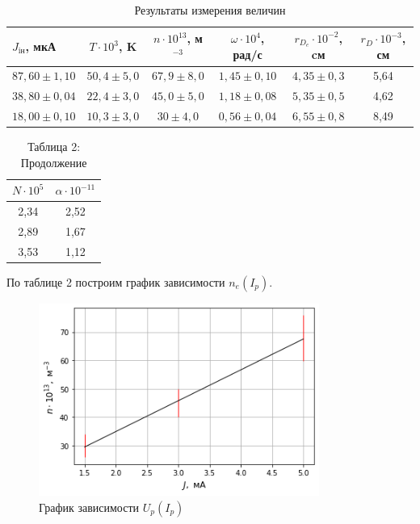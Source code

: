 \documentclass[a4paper]{article}
\theoremstyle{definition}
\theoremstyle{remark}
\begin{document}
        \begin{table}[h!]
            \centering
            \caption{Результаты измерения величин}
            \begin{tabular}{|c|c|c|c|c|c|}
            \hline
            \multicolumn{1}{|l|}{$J_{\text{iн}}$, мкА} & $T\cdot 10^3$, K & $n \cdot 10^13$, м$^{-3}$ & $\omega \cdot 10^4$, рад/с & $r_{D_{e}}\cdot 10^{-2}$, cм & $r_{D} \cdot 10^{-3}$, см \\ \hline
            $87,60 \pm 1,10$                           & $50,4 \pm 5,0$   & $67,9 \pm 8,0$            & $1,45 \pm 0,10$            & $4,35 \pm 0,3$               & 5,64                      \\ \hline
            $38,80 \pm 0,04$                           & $22,4 \pm 3,0$   & $45,0 \pm 5,0$            & $1,18 \pm 0,08$            & $5,35 \pm 0,5$               & 4,62                      \\ \hline
            $18,00 \pm 0,10$                           & $10,3 \pm 3,0$   & $30 \pm 4,0$              & $0,56 \pm 0,04$            & $6,55 \pm 0,8$               & 8,49                      \\ \hline
            \end{tabular}
            \end{table}

            \newpage

            \begin{table}[t!]
                \centering
                \caption*{Таблица 2: Продолжение}
                \begin{tabular}{|c|c|}
                \hline
                $N \cdot 10^5$ & $\alpha \cdot 10^{-11}$ \\ \hline
                2,34           & 2,52                    \\ \hline
                2,89           & 1,67                    \\ \hline
                3,53           & 1,12                    \\ \hline
                \end{tabular}
                \end{table}

            По таблице 2 построим график зависимости $n_e(I_p)$.

            \begin{figure}[h!]
                \centering
                \includegraphics[width = 260pt]{image/graphlast.png}
                \caption{График зависимости $U_p(I_p)$}
            \end{figure}
\end{document}
